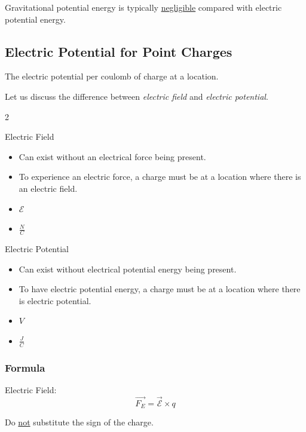 \begin{remark}
    Gravitational potential energy is typically \underline{negligible} compared with electric potential energy.
\end{remark}

\subsection{Electric Potential for Point Charges}
\begin{definition}
     The electric potential per coulomb of charge at a location. 
\end{definition}

Let us discuss the difference between \textit{electric field} and \textit{electric potential}.\\


\begin{paracol}{2}
    \centering
    \begin{leftcolumn}
        Electric Field
        \begin{itemize}
            \item Can exist without an electrical force being present.
            \item To experience an electric force, a charge must be at a location where there is an electric field.
            \item $\mathcal{E}$
            \item $\tfrac{N}{C}$
        \end{itemize}
    \end{leftcolumn}

    \begin{rightcolumn}
        Electric Potential
        \begin{itemize}
            \item Can exist without electrical potential energy being present.
            \item To have electric potential energy, a charge must be at a location where there is electric potential.
            \item $V$
            \item $\tfrac{J}{C}$
        \end{itemize}
    \end{rightcolumn}
\end{paracol}

\subsubsection{Formula}
Electric Field:
\begin{equation}
    \vec{F_E} = \vec{\mathcal{E}} \times q
\end{equation}
\begin{remark}
    Do \underline{not} substitute the sign of the charge.
\end{remark}

